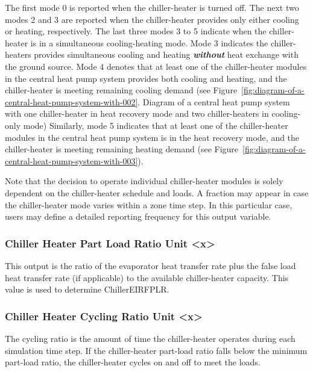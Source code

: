 The first mode 0 is reported when the chiller-heater is turned off. The next two modes 2 and 3 are reported when the chiller-heater provides only either cooling or heating, respectively. The last three modes 3 to 5 indicate when the chiller-heater is in a simultaneous cooling-heating mode. Mode 3 indicates the chiller-heaters provides simultaneous cooling and heating \textbf{\emph{without}} heat exchange with the ground source. Mode 4 denotes that at least one of the chiller-heater modules in the central heat pump system provides both cooling and heating, and the chiller-heater is meeting remaining cooling demand (see Figure~\ref{fig:diagram-of-a-central-heat-pump-system-with-002}. Diagram of a central heat pump system with one chiller-heater in heat recovery mode and two chiller-heaters in cooling-only mode) Similarly, mode 5 indicates that at least one of the chiller-heater modules in the central heat pump system is in the heat recovery mode, and the chiller-heater is meeting remaining heating demand (see Figure~\ref{fig:diagram-of-a-central-heat-pump-system-with-003}).

Note that the decision to operate individual chiller-heater modules is solely dependent on the chiller-heater schedule and loads. A fraction may appear in case the chiller-heater mode varies within a zone time step. In this particular case, users may define a detailed reporting frequency for this output variable.

\subsubsection{Chiller Heater Part Load Ratio Unit \textless{}x\textgreater{}}\label{chiller-heater-part-load-ratio-unit-x}

This output is the ratio of the evaporator heat transfer rate plus the false load heat transfer rate (if applicable) to the available chiller-heater capacity. This value is used to determine ChillerEIRFPLR.

\subsubsection{Chiller Heater Cycling Ratio Unit \textless{}x\textgreater{}}\label{chiller-heater-cycling-ratio-unit-x}

The cycling ratio is the amount of time the chiller-heater operates during each simulation time step. If the chiller-heater part-load ratio falls below the minimum part-load ratio, the chiller-heater cycles on and off to meet the loads.

